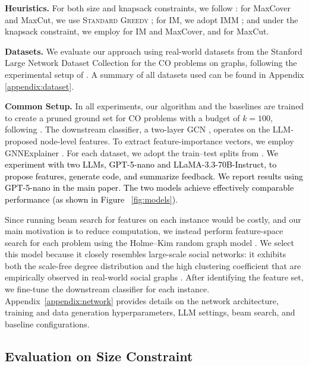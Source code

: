 \textbf{Heuristics.} For both size and knapsack constraints, we follow \citep{pmlr-v258-nath25a}: for MaxCover and MaxCut, we use \textsc{Standard Greedy} \citep{nemhauser1978analysis}; for IM, we adopt IMM \citep{tang2015influence}; and under the knapsack constraint, we employ \cite{khuller1999budgeted} for IM and MaxCover, and \cite{pham2023linear} for MaxCut.

\textbf{Datasets.}  We evaluate our approach using real-world datasets from the Stanford Large Network Dataset Collection \citep{leskovec2016snap} for the CO problems on graphs, following the experimental setup of \cite{ireland2022lense}. A summary of all datasets used can be found in Appendix \ref{appendix:dataset}.

\textbf{Common Setup.} In all experiments, our algorithm and the baselines are trained to create a pruned ground set for CO problems with a budget of $k=100$, following \citet{ireland2022lense}. The downstream classifier, a two-layer GCN \citep{kipf2016semi}, operates on the LLM-proposed node-level features. To extract feature-importance vectors, we employ GNNExplainer \citep{kipf2016semi}. For each dataset, we adopt the train–test splits from \citet{ireland2022lense}. \textcolor{black}{We experiment with two LLMs, GPT-5-nano and LLaMA-3.3-70B-Instruct, to propose features, generate code, and summarize feedback. We report results using GPT-5-nano in the main paper. The two models achieve effectively comparable performance (as shown in Figure ~\ref{fig:models})}.




Since running beam search for features on each instance would be costly, and our main motivation is to reduce computation, we instead perform feature-space search for each problem using the Holme–Kim random graph model \citep{holme2002growing}. We select this model because it closely resembles large-scale social networks: it exhibits both the scale-free degree distribution and the high clustering coefficient that are empirically observed in real-world social graphs \citep{holme2002growing}. After identifying the feature set, we fine-tune the downstream classifier for each instance. Appendix~\ref{appendix:network} provides details on the network architecture, training and data generation hyperparameters, LLM settings, beam search, and baseline configurations.


\subsection{Evaluation on Size Constraint}

